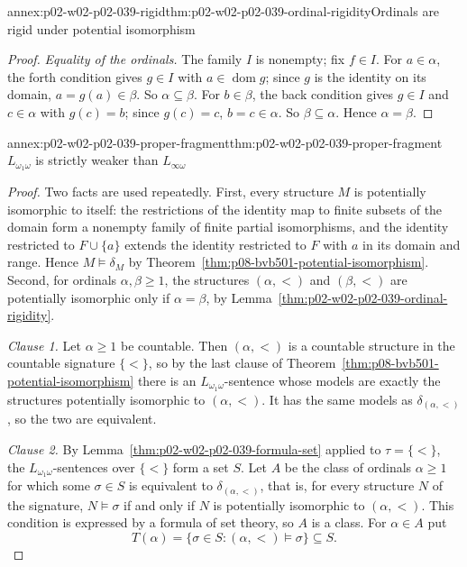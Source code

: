 \begin{annexitem}{annex:p02-w02-p02-039-rigid}{thm:p02-w02-p02-039-ordinal-rigidity}{Ordinals are rigid under potential isomorphism}
\begin{proof}
\emph{Equality of the ordinals.}  The family \(I\) is nonempty; fix
\(f\in I\).  For \(a\in\alpha\), the forth condition gives \(g\in I\) with
\(a\in\operatorname{dom}g\); since \(g\) is the identity on its domain,
\(a=g(a)\in\beta\).  So \(\alpha\subseteq\beta\).  For \(b\in\beta\), the
back condition gives \(g\in I\) and \(c\in\alpha\) with \(g(c)=b\); since
\(g(c)=c\), \(b=c\in\alpha\).  So \(\beta\subseteq\alpha\).  Hence
\(\alpha=\beta\).
\end{proof}
\end{annexitem}

\begin{annexitem}{annex:p02-w02-p02-039-proper-fragment}{thm:p02-w02-p02-039-proper-fragment}{\(L_{\omega_1\omega}\) is strictly weaker than \(L_{\infty\omega}\)}
\begin{proof}
Two facts are used repeatedly.  First, every structure \(M\) is potentially
isomorphic to itself: the restrictions of the identity map to finite subsets
of the domain form a nonempty family of finite partial isomorphisms, and the
identity restricted to \(F\cup\{a\}\) extends the identity restricted to
\(F\) with \(a\) in its domain and range.  Hence \(M\models\delta_M\) by
Theorem~\ref{thm:p08-bvb501-potential-isomorphism}.  Second, for ordinals
\(\alpha,\beta\geq1\), the structures \((\alpha,<)\) and \((\beta,<)\) are
potentially isomorphic only if \(\alpha=\beta\), by
Lemma~\ref{thm:p02-w02-p02-039-ordinal-rigidity}.

\emph{Clause 1.}  Let \(\alpha\geq1\) be countable.  Then \((\alpha,<)\) is
a countable structure in the countable signature \(\{<\}\), so by the last
clause of Theorem~\ref{thm:p08-bvb501-potential-isomorphism} there is an
\(L_{\omega_1\omega}\)-sentence whose models are exactly the structures
potentially isomorphic to \((\alpha,<)\).  It has the same models as
\(\delta_{(\alpha,<)}\), so the two are equivalent.

\emph{Clause 2.}  By Lemma~\ref{thm:p02-w02-p02-039-formula-set} applied to
\(\tau=\{<\}\), the \(L_{\omega_1\omega}\)-sentences over \(\{<\}\) form a
set \(S\).  Let \(A\) be the class of ordinals \(\alpha\geq1\) for which some
\(\sigma\in S\) is equivalent to \(\delta_{(\alpha,<)}\), that is, for every
structure \(N\) of the signature, \(N\models\sigma\) if and only if \(N\)
is potentially isomorphic to \((\alpha,<)\).  This condition is expressed by
a formula of set theory, so \(A\) is a class.  For \(\alpha\in A\) put
\[
 T(\alpha)=\{\sigma\in S:(\alpha,<)\models\sigma\}\subseteq S.
\]


\end{proof}
\end{annexitem}
